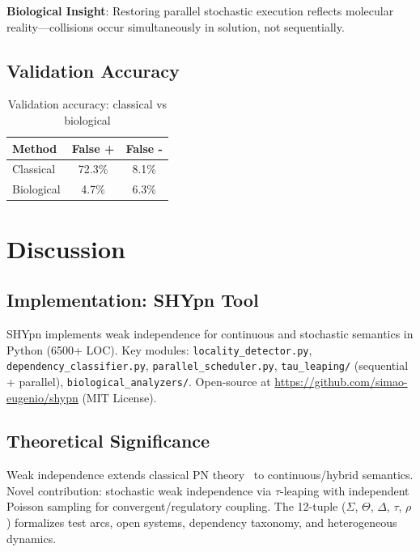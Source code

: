 \documentclass[twocolumn,11pt]{article}
\begin{document}
\textbf{Biological Insight}: Restoring parallel stochastic execution reflects molecular reality---collisions occur simultaneously in solution, not sequentially.

\subsection{Validation Accuracy}

\begin{table}[htbp]
\small
\caption{Validation accuracy: classical vs biological}
\label{tab:validation}
\vspace{-6pt}
\begin{tabular*}{\columnwidth}{@{\extracolsep{\fill}}lcc@{}}
\toprule
\textbf{Method} & \textbf{False +} & \textbf{False -} \\
\midrule
Classical & 72.3\% & 8.1\% \\
Biological & 4.7\% & 6.3\% \\
\bottomrule
\end{tabular*}
\vspace{-8pt}
\end{table}

\section{Discussion}

\subsection{Implementation: SHYpn Tool}

SHYpn implements weak independence for continuous and stochastic semantics in Python (6500+ LOC). Key modules: \texttt{locality\_detector.py}, \texttt{dependency\_classifier.py}, \texttt{parallel\_scheduler.py}, \texttt{tau\_leaping/} (sequential + parallel), \texttt{biological\_analyzers/}. Open-source at \url{https://github.com/simao-eugenio/shypn} (MIT License).

\subsection{Theoretical Significance}

Weak independence extends classical PN theory~\cite{Reisig2013,Murata1989} to continuous/hybrid semantics. Novel contribution: stochastic weak independence via $\tau$-leaping with independent Poisson sampling for convergent/regulatory coupling. The 12-tuple ($\Sigma$, $\Theta$, $\Delta$, $\tau$, $\rho$) formalizes test arcs, open systems, dependency taxonomy, and heterogeneous dynamics.
\end{document}
